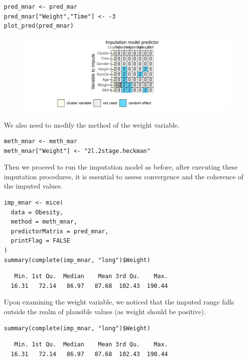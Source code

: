 \documentclass[
  article]{jss}
\begin{document}
\begin{verbatim}
pred_mnar <- pred_mar
pred_mnar["Weight","Time"] <- -3
plot_pred(pred_mnar)
\end{verbatim}

\begin{figure}[h]

{\centering \includegraphics{manuscript_files/figure-pdf/obesity-predmnar-1.pdf}

}

\end{figure}

We also need to modify the method of the weight variable.

\begin{verbatim}
meth_mnar <- meth_mar
meth_mnar["Weight"] <- "2l.2stage.heckman"
\end{verbatim}

Then we proceed to run the imputation model as before, after executing
these imputation procedures, it is essential to assess convergence and
the coherence of the imputed values.

\begin{verbatim}
imp_mnar <- mice(
  data = Obesity,
  method = meth_mnar,
  predictorMatrix = pred_mnar,
  printFlag = FALSE
)
summary(complete(imp_mnar, "long")$Weight)
\end{verbatim}

\begin{verbatim}
   Min. 1st Qu.  Median    Mean 3rd Qu.    Max. 
  16.31   72.14   86.97   87.68  102.43  190.44 
\end{verbatim}

Upon examining the weight variable, we noticed that the imputed range
falls outside the realm of plausible values (as weight should be
positive).

\begin{verbatim}
summary(complete(imp_mnar, "long")$Weight)
\end{verbatim}

\begin{verbatim}
   Min. 1st Qu.  Median    Mean 3rd Qu.    Max. 
  16.31   72.14   86.97   87.68  102.43  190.44 
\end{verbatim}
\end{document}
